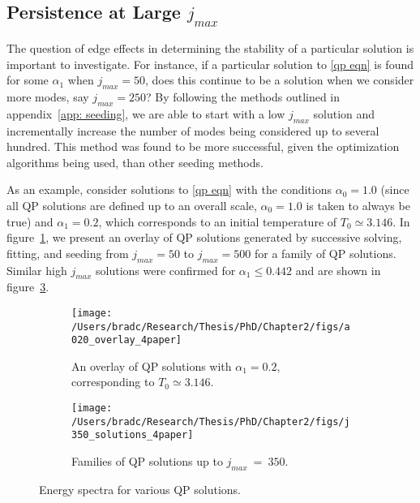 \documentclass[../PhD.tex]{subfiles}
\begin{document}

\subsection{Persistence at Large $j_{max}$}
\label{ssec: large jmax}

The question of edge effects in determining the stability of a particular solution is important to investigate. For instance, if a particular solution to \eqref{qp eqn} is found for some $\alpha_1$ when $j_{max} = 50$, does this continue to be a solution when we consider more modes, say $j_{max} = 250$? By following the methods outlined in appendix~\ref{app: seeding}, we are able to start with a low $j_{max}$ solution and incrementally increase the number of modes being considered up to several hundred. This method was found to be more successful, given the optimization algorithms being used, than other seeding methods.

As an example, consider solutions to \eqref{qp eqn} with the conditions $\alpha_0 = 1.0$ (since all QP solutions are defined up to an overall scale, $\alpha_0 = 1.0$ is taken to always be true) and $\alpha_1 = 0.2$, which corresponds to an initial temperature of $T_0 \simeq 3.146$. In figure~\ref{fig: a0.2solns}, we present an overlay of QP solutions generated by successive solving, fitting, and seeding from $j_{max} = 50$ to $j_{max}=500$ for a family of QP solutions. Similar high $j_{max}$ solutions were confirmed for $\alpha_1 \leq 0.442$ and are shown in figure~\ref{fig: j350 solutions}.

\begin{figure}[h]
	\centering
	\begin{subfigure}[t]{0.45\textwidth}
		\texttt{[image: /Users/bradc/Research/Thesis/PhD/Chapter2/figs/a020\_overlay\_4paper]}
		\caption{An overlay of QP solutions with $\alpha_1 = 0.2$, corresponding to $T_0 \simeq 3.146$.}
		\label{fig: a0.2solns}
	\end{subfigure}
	\:
	\begin{subfigure}[t]{0.45\textwidth}
		\texttt{[image: /Users/bradc/Research/Thesis/PhD/Chapter2/figs/j350\_solutions\_4paper]}
		\caption{Families of QP solutions up to $j_{max}~=~350$.}
		\label{fig: j350 solutions}
	\end{subfigure}
	\caption[Energy spectra for various QP solutions]{Energy spectra for various QP solutions.}
\end{figure}
\end{document}
